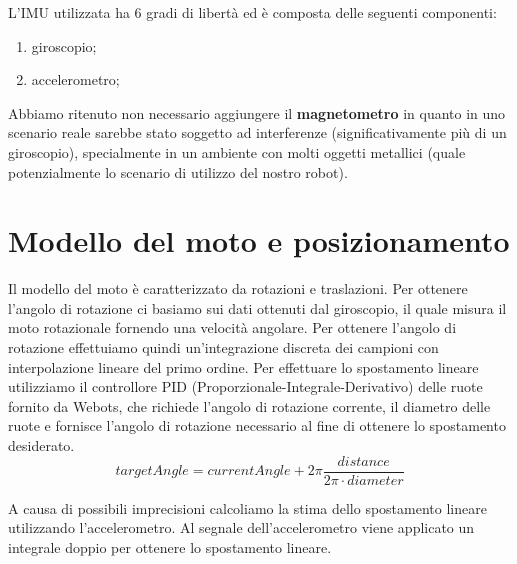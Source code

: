 \documentclass[a4paper]{article}
\begin{document}
    L'IMU utilizzata ha 6 gradi di libertà ed è composta delle seguenti componenti:
	\begin{enumerate}
		\item giroscopio;	
		\item accelerometro;
	\end{enumerate}
	Abbiamo ritenuto non necessario aggiungere il \textbf{magnetometro} in quanto in uno scenario reale sarebbe stato soggetto ad interferenze (significativamente più di un giroscopio), specialmente in un ambiente con molti oggetti metallici (quale potenzialmente lo scenario di utilizzo del nostro robot).

	\section{Modello del moto e posizionamento}
	Il modello del moto è caratterizzato da rotazioni e traslazioni. Per ottenere l'angolo di rotazione ci basiamo sui dati ottenuti dal giroscopio, il quale misura il moto rotazionale fornendo una velocità angolare. Per ottenere l'angolo di rotazione effettuiamo quindi un'integrazione discreta dei campioni con interpolazione lineare del primo ordine.
	Per effettuare lo spostamento lineare utilizziamo il controllore PID (Proporzionale-Integrale-Derivativo) delle ruote fornito da Webots, che richiede l'angolo di rotazione corrente, il diametro delle ruote e fornisce l'angolo di rotazione necessario al fine di ottenere lo spostamento desiderato.
	\begin{equation}\label{eq:odometry}
	targetAngle =
	currentAngle+2\pi\frac    {distance}
	{2\pi \cdot diameter}
	\end{equation}
	
	A causa di possibili imprecisioni calcoliamo la stima dello spostamento lineare utilizzando l'accelerometro. Al segnale dell'accelerometro viene applicato un integrale doppio per ottenere lo spostamento lineare.
	
\end{document}
